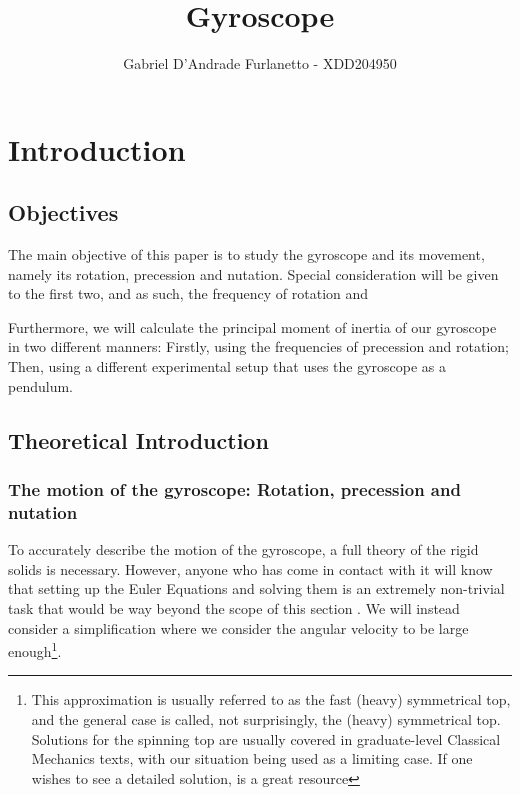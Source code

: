 \documentclass[a4paper,12pt]{article}
\begin{document}
\title{Gyroscope}
\author{Gabriel D'Andrade Furlanetto - XDD204950}
\maketitle


\pagebreak 
\section{Introduction}

\subsection{Objectives}

The main objective of this paper is to study the gyroscope and its movement, namely its rotation, precession and nutation. Special consideration will be given to the first two, and as such, the frequency of rotation and 

Furthermore, we will calculate the principal moment of inertia of our gyroscope in two different manners: Firstly, using the frequencies of precession and rotation; Then, using a different experimental setup that uses the gyroscope as a pendulum.

\subsection{Theoretical Introduction}

\subsubsection{The motion of the gyroscope: Rotation, precession and nutation}
To accurately describe the motion of the gyroscope, a full theory of the rigid solids is necessary. However, anyone who has come in contact with it will know that setting up the Euler Equations and solving them is an extremely non-trivial task that would be way beyond the scope of this section . We will instead consider a simplification where we consider the angular velocity to be large enough\footnote{This approximation is usually referred to as the fast (heavy) symmetrical top, and the general case is called, not surprisingly, the (heavy) symmetrical top. Solutions for the spinning top are usually covered in graduate-level Classical Mechanics texts, with our situation being used as a limiting case. If one wishes to see a detailed solution, \cite[208]{goldstein} is a great resource}. 
\end{document}
